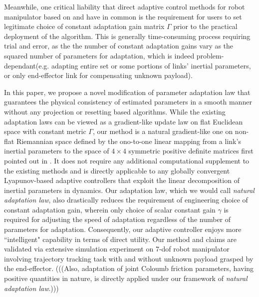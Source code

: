 \documentclass[letterpaper, 10 pt, conference]{ieeeconf}  %
\begin{document}
Meanwhile, one critical liability that direct adaptive control methods for robot manipulator based on \cite{Craig_AdaptiveControl} and \cite{Slotine_AdaptiveControl} have in common is the requirement for users to set legitimate choice of constant adaptation gain matrix $\Gamma$ prior to the practical deployment of the algorithm. This is generally  time-consuming process requiring trial and error, as the the number of constant adaptation gains vary as the squared number of parameters for adaptation, which is indeed problem-dependant(e.g. adapting entire set or some portions of links' inertial parameters, or only end-effector link for compensating unknown payload). 

In this paper, we propose a novel modification of parameter adaptation law that guarantees the physical consistency of estimated parameters in a smooth manner without any projection or resetting based algorithms. While the existing adaptation laws can be viewed as a gradient-like update law on flat Euclidean space with constant metric $\Gamma$, our method is a natural gradient\cite{Amari_Naturalgrad}-like one on non-flat Riemannian space defined by the ono-to-one linear mapping from a link's inertial parameters to the space of $4\times 4$ symmetric positive definite matrices first pointed out in \cite{Wensing_RAL}. It does not require any additional computational supplement to the existing methods and is directly applicable to any globally convergent Lyapunov-based adaptive controllers that exploit the linear decomposition of inertial parameters in dynamics. Our adaptation law, which we would call {\em natural adaptation law}, also drastically reduces the requirement of engineering choice of constant adaptation gain, wherein only choice of scalar constant gain $\gamma$ is required for adjusting the speed of adaptation regardless of the number of parameters for adaptation. Consequently, our adaptive controller enjoys more ``intelligent" capability in terms of direct utility. Our method and claims are validated via extensive simulation experiment on 7-dof robot manipulator involving trajectory tracking task with and without unknown payload grasped by the end-effector. (((Also, adaptation of joint Coloumb friction parameters, having positive quantities in nature, is directly applied under our framework of {\em natural adaptation law}.)))

\end{document}
